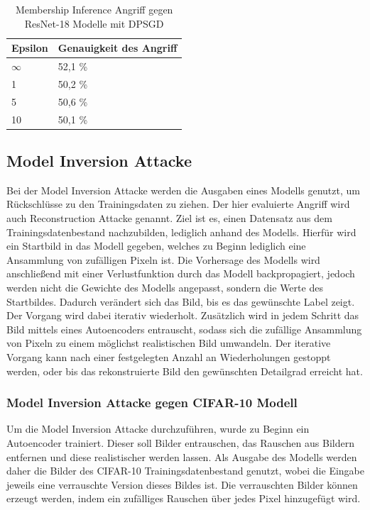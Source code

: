 \begin{table}[!htb]
\centering
\begin{tabular}{|l|l|}
\hline
\rowcolor[HTML]{CBCEFB} 
Epsilon  & Genauigkeit des Angriff \\ \hline
$\infty$ & 52,1 \%                 \\ \hline
1        & 50,2 \%                 \\ \hline
5        & 50,6 \%                 \\ \hline
10       & 50,1 \%                 \\ \hline
\end{tabular}
\caption{Membership Inference Angriff gegen ResNet-18 Modelle mit DPSGD}
\label{tab:mi_resnet18}
\end{table}

\subsection{Model Inversion Attacke}

Bei der Model Inversion Attacke werden die Ausgaben eines Modells genutzt, um Rückschlüsse zu den Trainingsdaten zu ziehen.
Der hier evaluierte Angriff wird auch Reconstruction Attacke genannt. 
Ziel ist es, einen Datensatz aus dem Trainingsdatenbestand nachzubilden, lediglich anhand des Modells.
Hierfür wird ein Startbild in das Modell gegeben, welches zu Beginn lediglich eine Ansammlung von zufälligen Pixeln ist.
Die Vorhersage des Modells wird anschließend mit einer Verlustfunktion durch das Modell backpropagiert, jedoch werden nicht die Gewichte des Modells angepasst, sondern die Werte des Startbildes.
Dadurch verändert sich das Bild, bis es das gewünschte Label zeigt.
Der Vorgang wird dabei iterativ wiederholt.
Zusätzlich wird in jedem Schritt das Bild mittels eines Autoencoders entrauscht, sodass sich die zufällige Ansammlung von Pixeln zu einem möglichst realistischen Bild umwandeln.
Der iterative Vorgang kann nach einer festgelegten Anzahl an Wiederholungen gestoppt werden, oder bis das rekonstruierte Bild den gewünschten Detailgrad erreicht hat.

\subsubsection*{Model Inversion Attacke gegen CIFAR-10 Modell}
Um die Model Inversion Attacke durchzuführen, wurde zu Beginn ein Autoencoder trainiert.
Dieser soll Bilder entrauschen, \dahe das Rauschen aus Bildern entfernen und diese realistischer werden lassen.
Als Ausgabe des Modells werden daher die Bilder des CIFAR-10 Trainingsdatenbestand genutzt, wobei die Eingabe jeweils eine verrauschte Version dieses Bildes ist.
Die verrauschten Bilder können erzeugt werden, indem ein zufälliges Rauschen über jedes Pixel hinzugefügt wird.

